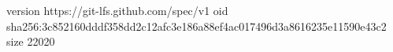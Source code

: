 version https://git-lfs.github.com/spec/v1
oid sha256:3c852160dddf358dd2c12afc3e186a88ef4ac017496d3a8616235e11590e43c2
size 22020
